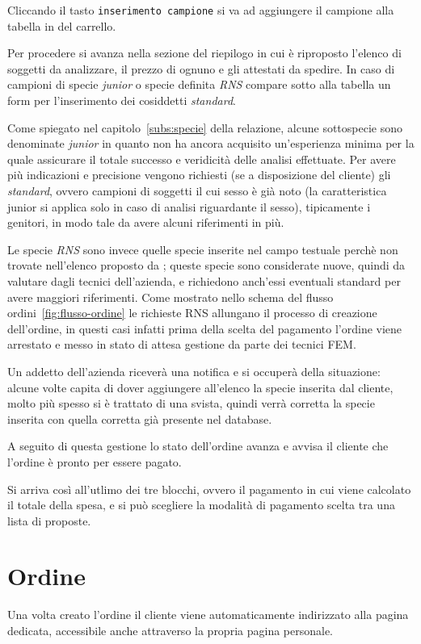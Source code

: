 Cliccando il tasto \texttt{inserimento campione} si va ad aggiungere il campione alla tabella in del carrello.

Per procedere si avanza nella sezione del \textsf{riepilogo} in cui è riproposto l'elenco di soggetti da analizzare, il prezzo di ognuno e gli attestati da spedire. In caso di campioni di specie \emph{junior} o specie definita \emph{RNS} compare sotto alla tabella un form per l'inserimento dei cosiddetti \emph{standard}.

Come spiegato nel capitolo~\ref{subs:specie} della relazione, alcune sottospecie sono denominate \emph{junior} in quanto {\fem} non ha ancora acquisito un'esperienza minima per la quale assicurare il totale successo e veridicità delle analisi effettuate. Per avere più indicazioni e precisione vengono richiesti (se a disposizione del cliente) gli \emph{standard}, ovvero campioni di soggetti il cui sesso è già noto (la caratteristica junior si applica solo in caso di analisi riguardante il sesso), tipicamente i genitori, in modo tale da avere alcuni riferimenti in più.

Le specie \emph{RNS} sono invece quelle specie inserite nel campo testuale perchè non trovate nell'elenco proposto da {\fem}; queste specie sono considerate nuove, quindi da valutare dagli tecnici dell'azienda, e richiedono anch'essi eventuali standard per avere maggiori riferimenti. Come mostrato nello schema del flusso ordini~\ref{fig:flusso-ordine} le richieste RNS allungano il processo di creazione dell'ordine, in questi casi infatti prima della scelta del pagamento l'ordine viene arrestato e messo in stato di \textsf{attesa gestione da parte dei tecnici FEM}.

Un addetto dell'azienda riceverà una notifica e si occuperà della situazione: alcune volte capita di dover aggiungere all'elenco la specie inserita dal cliente, molto più spesso si è trattato di una svista, quindi verrà corretta la specie inserita con quella corretta già presente nel database.

A seguito di questa gestione lo stato dell'ordine avanza e avvisa il cliente che l'ordine è pronto per essere pagato.

Si arriva così all'utlimo dei tre blocchi, ovvero il \textsf{pagamento} in cui viene calcolato il totale della spesa, e si può scegliere la modalità di pagamento scelta tra una lista di proposte.

\section*{Ordine}
Una volta creato l'ordine il cliente viene automaticamente indirizzato alla pagina dedicata, accessibile anche attraverso la propria pagina personale.


